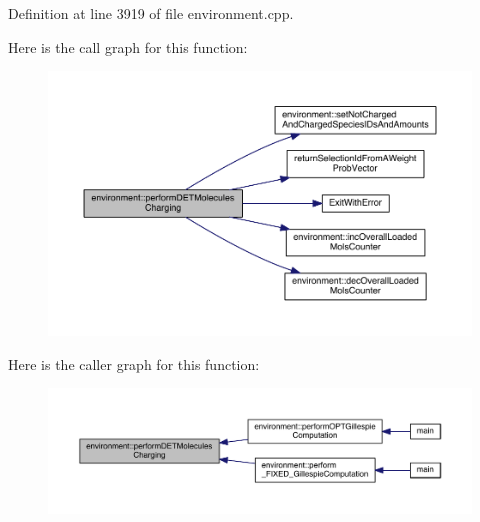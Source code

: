 Definition at line 3919 of file environment.\-cpp.



Here is the call graph for this function\-:
\nopagebreak
\begin{figure}[H]
\begin{center}
\leavevmode
\includegraphics[width=350pt]{a00014_adbaf165a12edd62c614a455544807ea3_cgraph}
\end{center}
\end{figure}




Here is the caller graph for this function\-:
\nopagebreak
\begin{figure}[H]
\begin{center}
\leavevmode
\includegraphics[width=350pt]{a00014_adbaf165a12edd62c614a455544807ea3_icgraph}
\end{center}
\end{figure}


